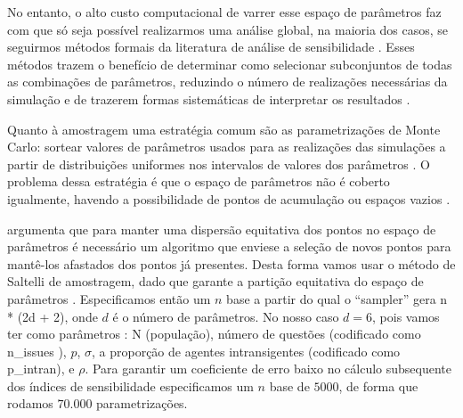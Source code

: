 No entanto, o alto custo computacional de varrer esse espaço de parâmetros faz com
que só seja possível realizarmos uma análise global, na maioria dos casos, se
seguirmos métodos formais da literatura de análise de sensibilidade
\cite{railsback2012agent}. Esses métodos trazem o benefício de determinar como
selecionar subconjuntos de todas as combinações de parâmetros, reduzindo o
número de realizações necessárias da simulação e de trazerem formas sistemáticas
de interpretar os resultados \cite{railsback2012agent}.

Quanto à amostragem uma estratégia comum são as parametrizações de Monte Carlo:
sortear valores de parâmetros usados para as realizações das simulações a partir
de distribuições uniformes nos intervalos de valores dos parâmetros
\cite{laver2011party}. O problema dessa estratégia é que o espaço de parâmetros
não é coberto igualmente, havendo a possibilidade de pontos de acumulação ou
espaços vazios \cite{pereda2017brief}.

 argumenta que para manter uma dispersão
equitativa dos pontos no espaço de parâmetros é necessário um algoritmo que
enviese a seleção de novos pontos para mantê-los afastados dos pontos já
presentes. Desta forma vamos usar o método de Saltelli de amostragem, dado que
garante a partição equitativa do espaço de parâmetros \cite{herman2017salib}.
Especificamos então um \(n\) base a partir do qual o ``sampler'' gera n * (2d +
2), onde \(d\) é o número de parâmetros. No nosso caso \(d = 6\), pois vamos ter
como parâmetros : N (população), número de questões (codificado como n\_issues
), \(p\), \(\sigma\), a proporção de agentes intransigentes (codificado como
p\_intran), e \(\rho\). Para garantir um coeficiente de erro baixo no cálculo
subsequente dos índices de sensibilidade especificamos um \(n\) base de
\(5000\), de forma que rodamos \(70.000\) parametrizações.


